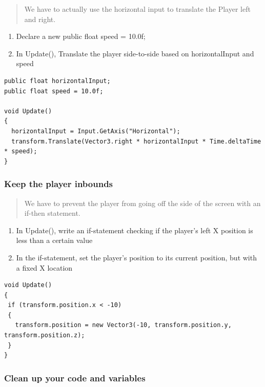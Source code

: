\documentclass[
]{book}
\providecommand{\tightlist}{%
  \setlength{\itemsep}{0pt}\setlength{\parskip}{0pt}}
\begin{document}
\begin{quote}
We have to actually use the horizontal input to translate the Player left and right.
\end{quote}

\begin{enumerate}
\def\labelenumi{\arabic{enumi}.}
\tightlist
\item
  Declare a new public float speed = 10.0f;
\item
  In Update(), Translate the player side-to-side based on horizontalInput and speed
\end{enumerate}

\begin{verbatim}
public float horizontalInput;
public float speed = 10.0f;

void Update()
{
  horizontalInput = Input.GetAxis("Horizontal");
  transform.Translate(Vector3.right * horizontalInput * Time.deltaTime * speed);
}

\end{verbatim}

\hypertarget{keep-the-player-inbounds}{%
\subsubsection{Keep the player inbounds}\label{keep-the-player-inbounds}}

\begin{quote}
We have to prevent the player from going off the side of the screen with an if-then statement.
\end{quote}

\begin{enumerate}
\def\labelenumi{\arabic{enumi}.}
\tightlist
\item
  In Update(), write an if-statement checking if the player's left X position is less than a certain value
\item
  In the if-statement, set the player's position to its current position, but with a fixed X location
\end{enumerate}

\begin{verbatim}
void Update()
{
 if (transform.position.x < -10)
 {
   transform.position = new Vector3(-10, transform.position.y, transform.position.z);
 }
}
\end{verbatim}

\hypertarget{clean-up-your-code-and-variables}{%
\subsubsection{Clean up your code and variables}\label{clean-up-your-code-and-variables}}
\end{document}
